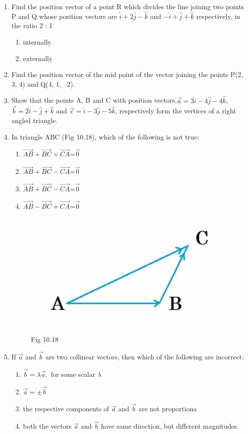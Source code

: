\documentclass[12pt]{article}
\begin{document}
\begin{enumerate}
\item Find the position vector of a point R which divides the line joining two points P
and Q whose position vectors are $\hat{i}+2\hat{j}-\hat{k}$ and $-\hat{i}+\hat{j}+\hat{k}$ respectively, in the
ratio 2 : 1
\begin{enumerate}[label=(\roman*)]
    \item  internally
    \item  externally
\end{enumerate}
\item Find the position vector of the mid point of the vector joining the points P(2, 3, 4)
and Q(4, 1, –2).
\item Show that the points A, B and C with position vectors,$\vec{a}=3\hat{i}-4\hat{j}-4\hat{k}$,$\vec{b}=2\hat{i}-\hat{j}+\hat{k}$ and $\vec{c}=\hat{i}-3\hat{j}-5\hat{k}$, respectively form the vertices of a right angled
triangle.
\item In triangle ABC (Fig 10.18), which of the following is not true:
 \begin{enumerate}
         \item $\overrightarrow{AB}+\overrightarrow{BC}+\overrightarrow{CA}$=$\vec{0}$
         \item $\overrightarrow{AB}+\overrightarrow{BC}-\overrightarrow{CA}$=$\vec{0}$
         \item $\overrightarrow{AB}+\overrightarrow{BC}-\overrightarrow{CA}$=$\vec{0}$
         \item $\overrightarrow{AB}-\overrightarrow{BC}+\overrightarrow{CA}$=$\vec{0}$
\end{enumerate}
\begin{figure}[!h]
\centering
        \includegraphics[width=0.3\columnwidth]{tri.jpg}
        \captionsetup{labelformat=empty}
        \caption{Fig 10.18}
	\label{(Fig:10.18)}
\end{figure}

\item If $\vec{a}$ and $\vec{b}$ are two collinear vectors, then which of the following are incorrect:
\begin{enumerate}
    \item $\vec{b}=\lambda\vec{a},$
 for some scalar $\lambda$
    \item $\vec{a}=\pm\vec{b}$
    \item the respective components of $\vec{a}$ and $\vec{b}$ are not proportiona
    \item both the vectors $\vec{a}$ and $\vec{b}$ have same direction, but different magnitudes.
\end{enumerate}
\end{enumerate}
\end{document}
